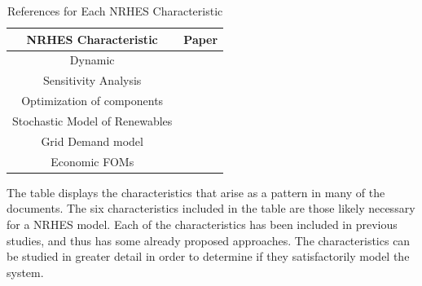 \begin{table}[h!]
\centering
\caption{References for Each NRHES Characteristic}
\begin{tabular}{ ||c | c|| }
 \hline
 NRHES Characteristic & Paper \\ [0.5ex]
 \hline \hline
 Dynamic & \cite{Garcia2013, Du2014, Kazimi, Garcia2016}\\
 \hline
 Sensitivity Analysis & \cite{Shropshire2011, Rehman2010, Adaramola2014, Chen2016}\\
 \hline
 Optimization of components & \cite{Chen2016,Ozcan2016, Forsberg2009,Garcia2015,Aumeier2011}\\
 \hline
 Stochastic Model of Renewables & \cite{Rabiti2015, Garcia2016,Locatelli2015}\\
 \hline
 Grid Demand model & \cite{Forsberg2013, Garcia2016,Garcia2013,Ruth2014,Chen2016}\\
 \hline
  Economic FOMs & \cite{Garcia2016,Chen2016,Rabiti2015,Epiney2016,Bragg-Sitton2014}\\
 \hline
\end{tabular}
\label{table:1}
\end{table}

The table displays the characteristics that arise as a pattern in many of the documents.  The six characteristics included in the table are those likely necessary for a NRHES model.  Each of the characteristics has been included in previous studies, and thus has some already proposed approaches.  The characteristics can be studied in greater detail in order to determine if they satisfactorily model the system.
